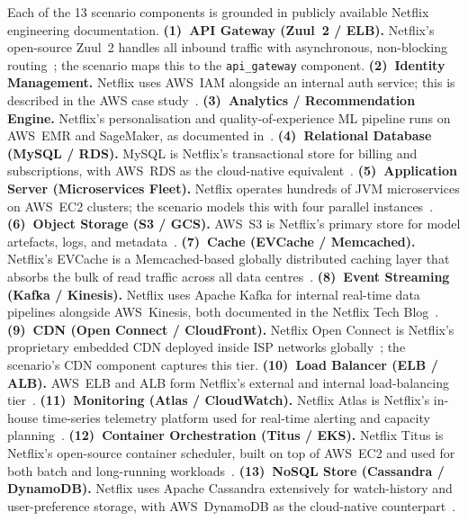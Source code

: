 \documentclass[journal]{IEEEtran}
\begin{document}
Each of the 13 scenario components is grounded in publicly available Netflix
engineering documentation.
%
\textbf{(1)~API Gateway (Zuul~2 / ELB).}
Netflix's open-source Zuul~2 handles all inbound traffic with asynchronous,
non-blocking routing~\cite{netflix_zuul}; the scenario maps this to the
\texttt{api\_gateway} component.
%
\textbf{(2)~Identity Management.}
Netflix uses AWS~IAM alongside an internal auth service; this is described
in the AWS case study~\cite{aws_netflix}.
%
\textbf{(3)~Analytics / Recommendation Engine.}
Netflix's personalisation and quality-of-experience ML pipeline runs on
AWS~EMR and SageMaker, as documented in~\cite{aws_netflix,netflix_techblog}.
%
\textbf{(4)~Relational Database (MySQL / RDS).}
MySQL is Netflix's transactional store for billing and subscriptions, with
AWS~RDS as the cloud-native equivalent~\cite{aws_netflix}.
%
\textbf{(5)~Application Server (Microservices Fleet).}
Netflix operates hundreds of JVM microservices on AWS~EC2 clusters; the
scenario models this with four parallel instances~\cite{aws_netflix,netflix_techblog}.
%
\textbf{(6)~Object Storage (S3 / GCS).}
AWS~S3 is Netflix's primary store for model artefacts, logs, and
metadata~\cite{aws_netflix}.
%
\textbf{(7)~Cache (EVCache / Memcached).}
Netflix's EVCache is a Memcached-based globally distributed caching layer that
absorbs the bulk of read traffic across all data
centres~\cite{netflix_techblog}.
%
\textbf{(8)~Event Streaming (Kafka / Kinesis).}
Netflix uses Apache Kafka for internal real-time data pipelines alongside
AWS~Kinesis, both documented in the Netflix Tech
Blog~\cite{netflix_techblog}.
%
\textbf{(9)~CDN (Open Connect / CloudFront).}
Netflix Open Connect is Netflix's proprietary embedded CDN deployed inside
ISP networks globally~\cite{netflix_openconnect}; the scenario's CDN
component captures this tier.
%
\textbf{(10)~Load Balancer (ELB / ALB).}
AWS~ELB and ALB form Netflix's external and internal load-balancing
tier~\cite{aws_netflix}.
%
\textbf{(11)~Monitoring (Atlas / CloudWatch).}
Netflix Atlas is Netflix's in-house time-series telemetry platform used for
real-time alerting and capacity planning~\cite{netflix_atlas}.
%
\textbf{(12)~Container Orchestration (Titus / EKS).}
Netflix Titus is Netflix's open-source container scheduler, built on top of
AWS~EC2 and used for both batch and long-running
workloads~\cite{netflix_titus}.
%
\textbf{(13)~NoSQL Store (Cassandra / DynamoDB).}
Netflix uses Apache Cassandra extensively for watch-history and user-preference
storage, with AWS~DynamoDB as the cloud-native
counterpart~\cite{aws_netflix,netflix_techblog}.
\end{document}
